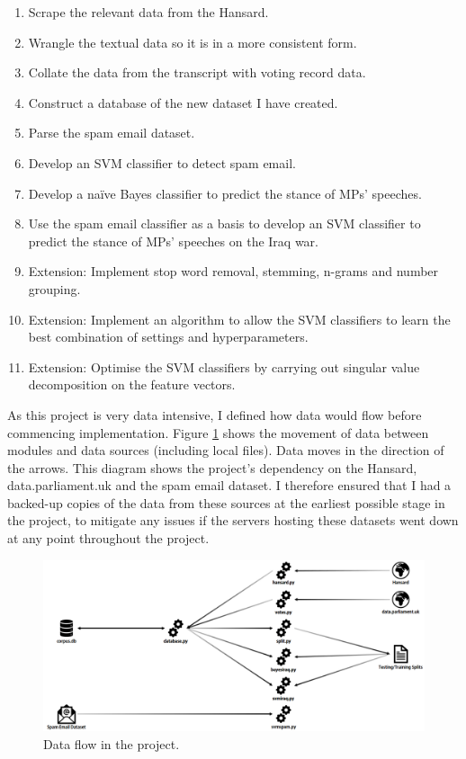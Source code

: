 \documentclass[12pt,a4paper,twoside,openright]{report}
\begin{document}
\begin{enumerate}
	\item Scrape the relevant data from the Hansard.
	\item Wrangle the textual data so it is in a more consistent form.
	\item Collate the data from the transcript with voting record data.
	\item Construct a database of the new dataset I have created.
	\item Parse the spam email dataset.
	\item Develop an SVM classifier to detect spam email.
	\item Develop a na\"{i}ve Bayes classifier to predict the stance of MPs' speeches.
	\item Use the spam email classifier as a basis to develop an SVM classifier to predict the stance of MPs' speeches on the Iraq war.
	\item Extension: Implement stop word removal, stemming, n-grams and number grouping.
	\item Extension: Implement an algorithm to allow the SVM classifiers to learn the best combination of settings and hyperparameters.
	\item Extension: Optimise the SVM classifiers by carrying out singular value decomposition on the feature vectors.
\end{enumerate}

As this project is very data intensive, I defined how data would flow before commencing implementation. Figure \ref{fig:dataflow} shows the movement of data between modules and data sources (including local files). Data moves in the direction of the arrows. This diagram shows the project's dependency on the Hansard, data.parliament.uk and the spam email dataset. I therefore ensured that I had a backed-up copies of the data from these sources at the earliest possible stage in the project, to mitigate any issues if the servers hosting these datasets went down at any point throughout the project.
\newline
\begin{figure}
	\includegraphics[width=\linewidth]{figs/dataflow3.png}
	\caption{Data flow in the project.}
	\label{fig:dataflow}
\end{figure}
\end{document}
